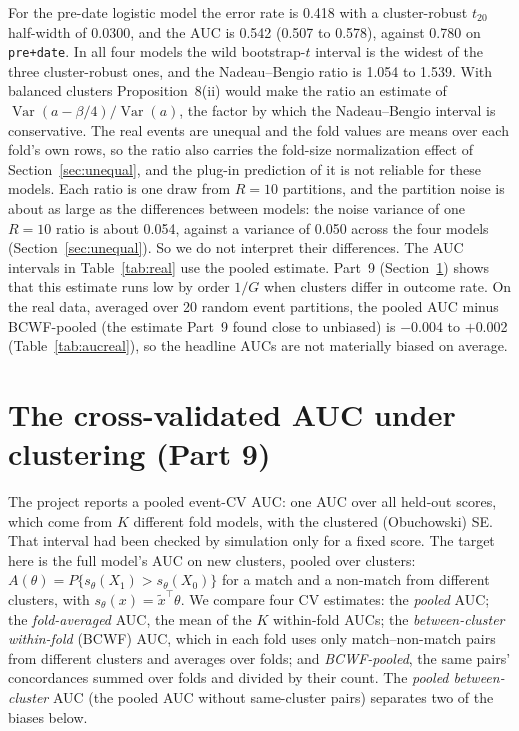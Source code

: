 \documentclass[11pt]{amsart}
\theoremstyle{plain}
\theoremstyle{definition}
\theoremstyle{remark}
\newcommand{\Var}{\operatorname{Var}}
\begin{document}
For the pre-date logistic model the error rate is 0.418 with a cluster-robust $t_{20}$ half-width of 0.0300, and the AUC is 0.542 (0.507 to 0.578), against 0.780 on \texttt{pre+date}. In all four models the wild bootstrap-$t$ interval is the widest of the three cluster-robust ones, and the Nadeau--Bengio ratio is 1.054 to 1.539. With balanced clusters Proposition~8(ii) would make the ratio an estimate of $\Var(a-\beta/4)/\Var(a)$, the factor by which the Nadeau--Bengio interval is conservative. The real events are unequal and the fold values are means over each fold's own rows, so the ratio also carries the fold-size normalization effect of Section~\ref{sec:unequal}, and the plug-in prediction of it is not reliable for these models. Each ratio is one draw from $R=10$ partitions, and the partition noise is about as large as the differences between models: the noise variance of one $R=10$ ratio is about 0.054, against a variance of 0.050 across the four models (Section~\ref{sec:unequal}). So we do not interpret their differences. The AUC intervals in Table~\ref{tab:real} use the pooled estimate. Part~9 (Section~\ref{sec:auc}) shows that this estimate runs low by order $1/G$ when clusters differ in outcome rate. On the real data, averaged over 20 random event partitions, the pooled AUC minus BCWF-pooled (the estimate Part~9 found close to unbiased) is $-$0.004 to $+$0.002 (Table~\ref{tab:aucreal}), so the headline AUCs are not materially biased on average.

\section{The cross-validated AUC under clustering (Part 9)}\label{sec:auc}

The project reports a pooled event-CV AUC: one AUC over all held-out scores, which come from $K$ different fold models, with the clustered (Obuchowski) SE. That interval had been checked by simulation only for a fixed score. The target here is the full model's AUC on new clusters, pooled over clusters: $A(\theta)=P\{s_\theta(X_1)>s_\theta(X_0)\}$ for a match and a non-match from different clusters, with $s_\theta(x)=\tilde x^\top\theta$. We compare four CV estimates: the \emph{pooled} AUC; the \emph{fold-averaged} AUC, the mean of the $K$ within-fold AUCs; the \emph{between-cluster within-fold} (BCWF) AUC, which in each fold uses only match--non-match pairs from different clusters and averages over folds; and \emph{BCWF-pooled}, the same pairs' concordances summed over folds and divided by their count. The \emph{pooled between-cluster} AUC (the pooled AUC without same-cluster pairs) separates two of the biases below.
\end{document}
